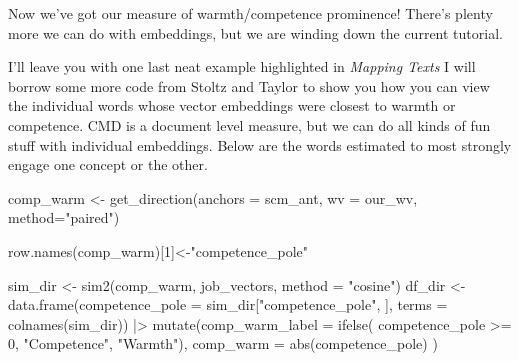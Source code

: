 \documentclass[
  letterpaper,
  DIV=11,
  numbers=noendperiod]{scrreprt}
\newenvironment{Shaded}{\begin{snugshade}}{\end{snugshade}}
\newcommand{\AttributeTok}[1]{\textcolor[rgb]{0.40,0.45,0.13}{#1}}
\newcommand{\DecValTok}[1]{\textcolor[rgb]{0.68,0.00,0.00}{#1}}
\newcommand{\FunctionTok}[1]{\textcolor[rgb]{0.28,0.35,0.67}{#1}}
\newcommand{\NormalTok}[1]{\textcolor[rgb]{0.00,0.23,0.31}{#1}}
\newcommand{\OtherTok}[1]{\textcolor[rgb]{0.00,0.23,0.31}{#1}}
\newcommand{\SpecialCharTok}[1]{\textcolor[rgb]{0.37,0.37,0.37}{#1}}
\newcommand{\StringTok}[1]{\textcolor[rgb]{0.13,0.47,0.30}{#1}}
\begin{document}
Now we've got our measure of warmth/competence prominence! There's
plenty more we can do with embeddings, but we are winding down the
current tutorial.

I'll leave you with one last neat example highlighted in \emph{Mapping
Texts} I will borrow some more code from Stoltz and Taylor to show you
how you can view the individual words whose vector embeddings were
closest to warmth or competence. CMD is a document level measure, but we
can do all kinds of fun stuff with individual embeddings. Below are the
words estimated to most strongly engage one concept or the other.

\begin{Shaded}
\begin{Highlighting}[]
\NormalTok{comp\_warm }\OtherTok{\textless{}{-}} \FunctionTok{get\_direction}\NormalTok{(}\AttributeTok{anchors =}\NormalTok{ scm\_ant, }\AttributeTok{wv =}\NormalTok{ our\_wv, }\AttributeTok{method=}\StringTok{"paired"}\NormalTok{)}

\FunctionTok{row.names}\NormalTok{(comp\_warm)[}\DecValTok{1}\NormalTok{]}\OtherTok{\textless{}{-}}\StringTok{"competence\_pole"}

\NormalTok{sim\_dir }\OtherTok{\textless{}{-}} \FunctionTok{sim2}\NormalTok{(comp\_warm, job\_vectors, }\AttributeTok{method =} \StringTok{"cosine"}\NormalTok{)}
\NormalTok{df\_dir }\OtherTok{\textless{}{-}} \FunctionTok{data.frame}\NormalTok{(}\AttributeTok{competence\_pole =}\NormalTok{ sim\_dir[}\StringTok{"competence\_pole"}\NormalTok{, ],}
                     \AttributeTok{terms =} \FunctionTok{colnames}\NormalTok{(sim\_dir)) }\SpecialCharTok{|\textgreater{}}
  \FunctionTok{mutate}\NormalTok{(}\AttributeTok{comp\_warm\_label =} \FunctionTok{ifelse}\NormalTok{(}
\NormalTok{    competence\_pole }\SpecialCharTok{\textgreater{}=} \DecValTok{0}\NormalTok{,}
    \StringTok{"Competence"}\NormalTok{, }\StringTok{"Warmth"}\NormalTok{),}
    \AttributeTok{comp\_warm =} \FunctionTok{abs}\NormalTok{(competence\_pole)}
\NormalTok{  )}


\end{Highlighting}
\end{Shaded}
\end{document}
